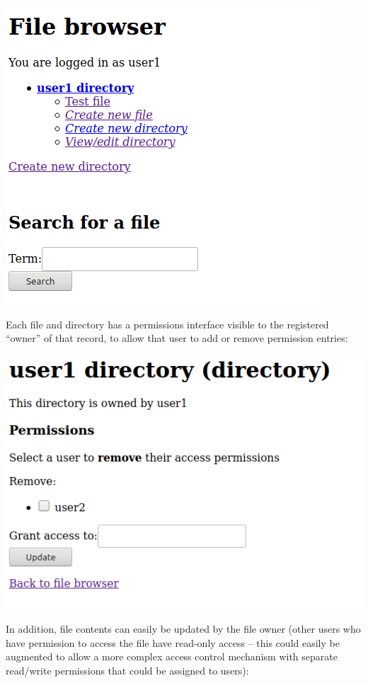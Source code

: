 \documentclass{article}
\begin{document}
\begin{center}
  \includegraphics[scale=0.5]{05-browser1.png}
\end{center}

Each file and directory has a permissions interface visible to the registered ``owner'' of that record, to allow that user to add or remove permission entries:

\begin{center}
  \includegraphics[scale=0.5]{06-browser2-perms.png}
\end{center}

In addition, file contents can easily be updated by the file owner (other users who have permission to access the file have read-only access -- this could easily be augmented to allow a more complex access control mechanism with separate read/write permissions that could be assigned to users):
\end{document}
